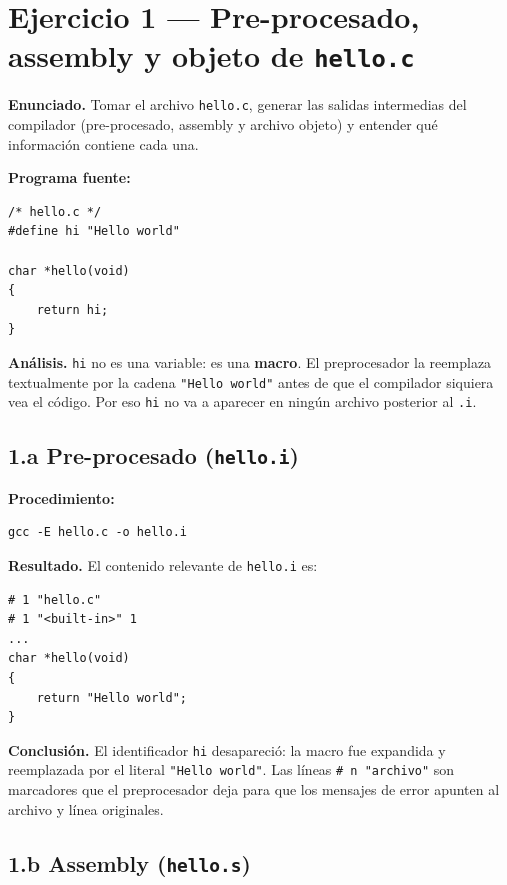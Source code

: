 \documentclass[11pt,a4paper]{article}
\begin{document}
\section{Ejercicio 1 --- Pre-procesado, assembly y objeto de \texttt{hello.c}}

\textbf{Enunciado.} Tomar el archivo \texttt{hello.c}, generar las
salidas intermedias del compilador (pre-procesado, assembly y archivo
objeto) y entender qué información contiene cada una.

\textbf{Programa fuente:}

\begin{lstlisting}[style=cstyle]
/* hello.c */
#define hi "Hello world"

char *hello(void)
{
    return hi;
}
\end{lstlisting}

\textbf{Análisis.} \texttt{hi} no es una variable: es una
\textbf{macro}. El preprocesador la reemplaza textualmente por la
cadena \texttt{"Hello world"} antes de que el compilador siquiera vea
el código. Por eso \texttt{hi} no va a aparecer en ningún archivo
posterior al \texttt{.i}.

\subsection*{1.a Pre-procesado (\texttt{hello.i})}

\textbf{Procedimiento:}

\begin{lstlisting}
gcc -E hello.c -o hello.i
\end{lstlisting}

\textbf{Resultado.} El contenido relevante de \texttt{hello.i} es:

\begin{lstlisting}[style=cstyle]
# 1 "hello.c"
# 1 "<built-in>" 1
...
char *hello(void)
{
    return "Hello world";
}
\end{lstlisting}

\textbf{Conclusión.} El identificador \texttt{hi} desapareció: la
macro fue expandida y reemplazada por el literal \texttt{"Hello
world"}. Las líneas \texttt{\# n "archivo"} son marcadores que el
preprocesador deja para que los mensajes de error apunten al archivo
y línea originales.

\subsection*{1.b Assembly (\texttt{hello.s})}
\end{document}
